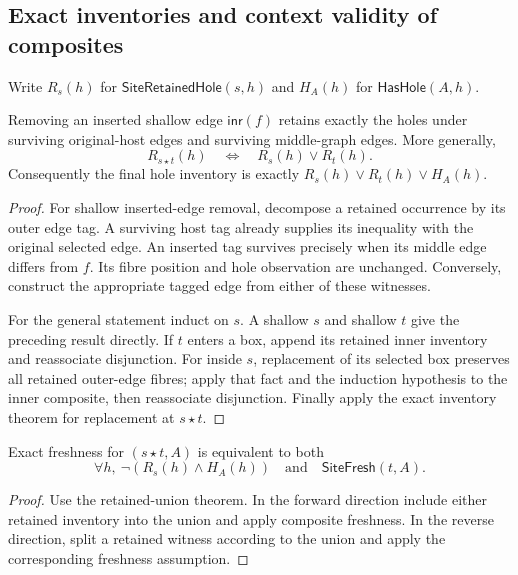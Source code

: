 \subsection{Exact inventories and context validity of composites}

Write $R_s(h)$ for $\mathsf{SiteRetainedHole}(s,h)$ and $H_A(h)$ for
$\mathsf{HasHole}(A,h)$.

\begin{lemma}
Removing an inserted shallow edge $\mathsf{inr}(f)$ retains exactly the holes
under surviving original-host edges and surviving middle-graph edges. More
generally,
\[
 R_{s\star t}(h)\quad\Longleftrightarrow\quad R_s(h)\lor R_t(h).
\]
Consequently the final hole inventory is exactly
$R_s(h)\lor R_t(h)\lor H_A(h)$.
\end{lemma}
\begin{proof}
For shallow inserted-edge removal, decompose a retained occurrence by its outer
edge tag. A surviving host tag already supplies its inequality with the original
selected edge. An inserted tag survives precisely when its middle edge differs
from $f$. Its fibre position and hole observation are unchanged. Conversely,
construct the appropriate tagged edge from either of these witnesses.

For the general statement induct on $s$. A shallow $s$ and shallow $t$ give
the preceding result directly. If $t$ enters a box, append its retained inner
inventory and reassociate disjunction. For inside $s$, replacement of its
selected box preserves all retained outer-edge fibres; apply that fact and
the induction hypothesis to the inner composite, then reassociate disjunction.
Finally apply the exact inventory theorem for replacement at $s\star t$.
\end{proof}

\begin{lemma}
Exact freshness for $(s\star t,A)$ is equivalent to both
\[
 \forall h,\ \neg(R_s(h)\land H_A(h))
 \quad\text{and}\quad
 \mathsf{SiteFresh}(t,A).
\]
\end{lemma}
\begin{proof}
Use the retained-union theorem. In the forward direction include either retained
inventory into the union and apply composite freshness. In the reverse direction,
split a retained witness according to the union and apply the corresponding
freshness assumption.
\end{proof}

